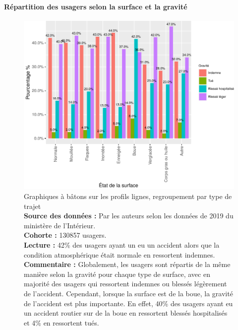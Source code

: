 \documentclass[french,]{tp}
\let\oldparagraph\paragraph
\renewcommand{\paragraph}[1]{\oldparagraph{#1}\mbox{}}
\begin{document}
\newpage

\hypertarget{ruxe9partition-des-usagers-selon-la-surface-et-la-gravituxe9}{%
\paragraph{Répartition des usagers selon la surface et la gravité}\label{ruxe9partition-des-usagers-selon-la-surface-et-la-gravituxe9}}







\begin{figure}[ht!]

{\centering \includegraphics{Prediction_Gravite_files/figure-latex/barplotsurface-1} 

}

\caption{Graphiques à bâtons sur les profils lignes, regroupement par type de trajet\\
\textbf{Source des données :} Par les auteurs selon les données de 2019 du ministère de l'Intérieur.\\
\textbf{Cohorte :} 130857 usagers.\\
\textbf{Lecture :} 42\% des usagers ayant un eu un accident alors que la condition atmosphérique était normale en ressortent indemnes.\\
\textbf{Commentaire :} Globalement, les usagers sont répartis de la même manière selon la gravité pour chaque type de surface, avec en majorité des usagers qui ressortent indemnes ou blessés légèrement de l'accident. Cependant, lorsque la surface est de la boue, la gravité de l'accident est plus importante. En effet, 40\% des usagers ayant eu un accident routier sur de la boue en ressortent blessés hospitalisés et 4\% en ressortent tués.}\label{fig:barplotsurface}
\end{figure}
\end{document}
